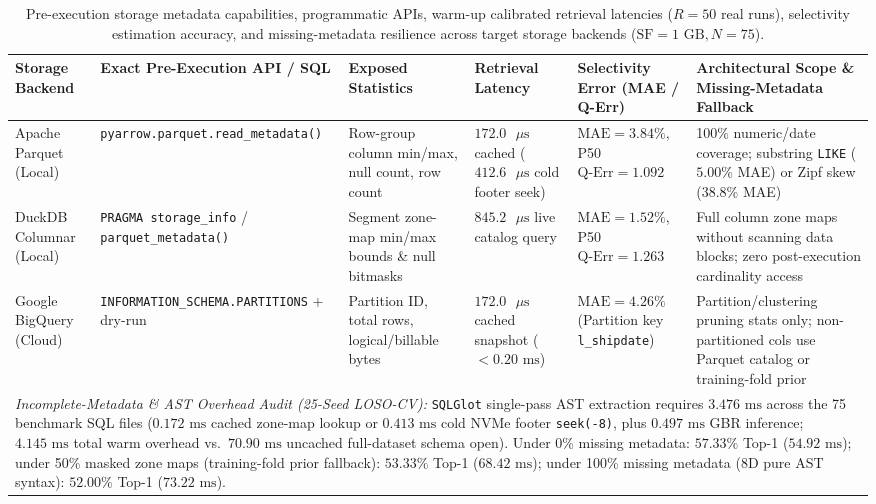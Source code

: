 \documentclass[10pt,a4paper]{article}
\begin{document}
\begingroup
\renewcommand{\thetable}{2B}
\begin{table}[t!]
\centering
\caption{Pre-execution storage metadata capabilities, programmatic APIs, warm-up calibrated retrieval latencies ($R=50$ real runs), selectivity estimation accuracy, and missing-metadata resilience across target storage backends ($\text{SF}=1\text{ GB}, N=75$).}
\label{tab:metadata_scope_audit}
\footnotesize
\setlength{\tabcolsep}{4pt}
\renewcommand{\arraystretch}{1.12}
\begin{tabular}{p{2.2cm}p{2.9cm}p{2.8cm}p{2.2cm}p{2.3cm}p{3.6cm}}
\hline
\textbf{Storage Backend} & \textbf{Exact Pre-Execution API / SQL} & \textbf{Exposed Statistics} & \textbf{Retrieval Latency} & \textbf{Selectivity Error (MAE / Q-Err)} & \textbf{Architectural Scope \& Missing-Metadata Fallback} \\
\hline
Apache Parquet (Local) & \texttt{pyarrow.parquet.\allowbreak read\_metadata()} & Row-group column min/max, null count, row count & $172.0\text{ }\mu\text{s}$ cached ($412.6\text{ }\mu\text{s}$ cold footer seek) & $\text{MAE}=3.84\%$, P50 $\text{Q-Err}=1.092$ & 100\% numeric/date coverage; substring \texttt{LIKE} ($5.00\%$ MAE) or Zipf skew ($38.8\%$ MAE) \\
DuckDB Columnar (Local) & \texttt{PRAGMA storage\_info} / \texttt{parquet\_metadata()} & Segment zone-map min/max bounds \& null bitmasks & $845.2\text{ }\mu\text{s}$ live catalog query & $\text{MAE}=1.52\%$, P50 $\text{Q-Err}=1.263$ & Full column zone maps without scanning data blocks; zero post-execution cardinality access \\
Google BigQuery (Cloud) & \texttt{INFORMATION\_SCHEMA.\allowbreak PARTITIONS} + dry-run & Partition ID, total rows, logical/billable bytes & $172.0\text{ }\mu\text{s}$ cached snapshot ($<0.20\text{ ms}$) & $\text{MAE}=4.26\%$ (Partition key \texttt{l\_shipdate}) & Partition/clustering pruning stats only; non-partitioned cols use Parquet catalog or training-fold prior \\
\hline
\multicolumn{6}{p{16.2cm}}{\footnotesize \textit{Incomplete-Metadata \& AST Overhead Audit (25-Seed LOSO-CV):} \texttt{SQLGlot} single-pass AST extraction requires $3.476\text{ ms}$ across the 75 benchmark SQL files ($0.172\text{ ms}$ cached zone-map lookup or $0.413\text{ ms}$ cold NVMe footer \texttt{seek(-8)}, plus $0.497\text{ ms}$ GBR inference; $4.145\text{ ms}$ total warm overhead vs.\ $70.90\text{ ms}$ uncached full-dataset schema open). Under 0\% missing metadata: $57.33\%$ Top-1 ($54.92\text{ ms}$); under 50\% masked zone maps (training-fold prior fallback): $53.33\%$ Top-1 ($68.42\text{ ms}$); under 100\% missing metadata (8D pure AST syntax): $52.00\%$ Top-1 ($73.22\text{ ms}$).} \\
\hline
\end{tabular}
\end{table}
\addtocounter{table}{-1}
\endgroup
\end{document}
